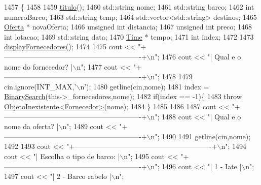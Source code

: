 \begin{DoxyCode}
1457                              \{
1458 
1459     \hyperlink{classEmpresa_ad79f7196a8ce7256771cbd7b9542155c}{titulo}();
1460     std::string nome;
1461     std::string barco;
1462     \textcolor{keywordtype}{int} numeroBarco;
1463     std::string temp;
1464     std::vector<std::string> destinos;
1465     \hyperlink{classOferta}{Oferta} * novaOferta;
1466     \textcolor{keywordtype}{unsigned} \textcolor{keywordtype}{int} distancia;
1467     \textcolor{keywordtype}{unsigned} \textcolor{keywordtype}{int} preco;
1468     \textcolor{keywordtype}{int} lotacao;
1469     std::string data;
1470     \hyperlink{classTime}{Time} * tempo;
1471     \textcolor{keywordtype}{int} index;
1472 
1473     \hyperlink{classEmpresa_a55c3756c01b45b41ad03f4e4f3e4dcac}{displayFornecedores}();
1474 
1475     cout << \textcolor{stringliteral}{"+----------------------------------------------------------+\(\backslash\)n"};
1476     cout << \textcolor{stringliteral}{"| Qual e o nome do fornecedor?                             |\(\backslash\)n"};
1477     cout << \textcolor{stringliteral}{"+----------------------------------------------------------+\(\backslash\)n"};
1478 
1479     cin.ignore(INT\_MAX,\textcolor{charliteral}{'\(\backslash\)n'});
1480     getline(cin,nome);
1481     index = \hyperlink{extras_8h_abc85c93edf561168b5bbee8054caa388}{BinarySearch}(this->\_fornecedores,nome);
1482     \textcolor{keywordflow}{if}(index == -1)\{
1483         \textcolor{keywordflow}{throw} \hyperlink{classObjetoInexistente}{ObjetoInexistente<Fornecedor>}(nome);
1484     \}
1485     
1486 
1487     cout << \textcolor{stringliteral}{"+----------------------------------------------------------+\(\backslash\)n"};
1488     cout << \textcolor{stringliteral}{"| Qual e o nome da oferta?                                 |\(\backslash\)n"};
1489     cout << \textcolor{stringliteral}{"+----------------------------------------------------------+\(\backslash\)n"};
1490 
1491     getline(cin,nome);
1492 
1493     cout << \textcolor{stringliteral}{"+----------------------------------------------------------+\(\backslash\)n"};
1494     cout << \textcolor{stringliteral}{"| Escolha o tipo de barco:                                 |\(\backslash\)n"};
1495     cout << \textcolor{stringliteral}{"+----------------------------------------------------------+\(\backslash\)n"};
1496     cout << \textcolor{stringliteral}{"| 1 - Iate                                                 |\(\backslash\)n"};
1497     cout << \textcolor{stringliteral}{"| 2 - Barco rabelo                                         |\(\backslash\)n"};

\end{DoxyCode}
